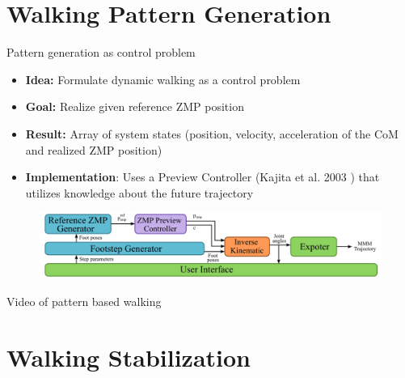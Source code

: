\section{Walking Pattern Generation}\label{walking-pattern-generation}

\begin{frame}{Pattern generation as control problem}

\begin{itemize}
\itemsep1pt\parskip0pt
\item
  \textbf{Idea:} Formulate dynamic walking as a control problem
\item
  \textbf{Goal:} Realize given reference ZMP position
\item
  \textbf{Result:} Array of system states (position, velocity,
  acceleration of the CoM and realized ZMP position)
\item
  \textbf{Implementation}: Uses a Preview Controller (Kajita et al. 2003
  \cite{kajita2003biped}) that utilizes knowledge about the future
  trajectory
\end{itemize}

\begin{figure}
  \begin{center}
     \includegraphics[width=\textwidth]{images/pattern_generator_architechture.png}
  \end{center}
\end{figure}

\end{frame}

\begin{frame}{Video of pattern based walking}

\begin{figure}
  \begin{center}
  \end{center}
\end{figure}

\end{frame}

\section{Walking Stabilization}\label{walking-stabilization}

